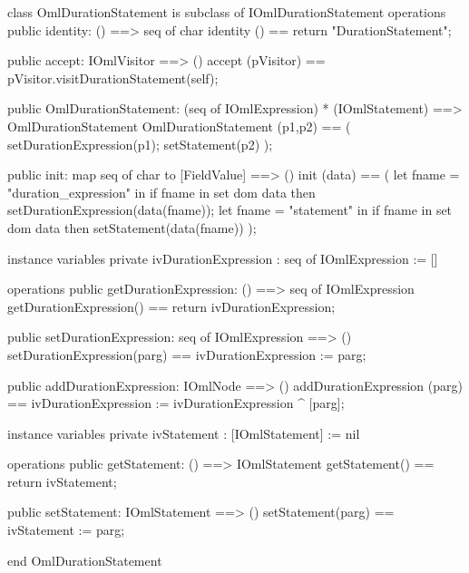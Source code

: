 \begin{vdm_al}
class OmlDurationStatement is subclass of IOmlDurationStatement
operations
  public identity: () ==> seq of char
  identity () == return "DurationStatement";

  public accept: IOmlVisitor ==> ()
  accept (pVisitor) == pVisitor.visitDurationStatement(self);

  public OmlDurationStatement:
      (seq of IOmlExpression) *
      (IOmlStatement) ==> OmlDurationStatement
  OmlDurationStatement (p1,p2) == 
   ( setDurationExpression(p1);
     setStatement(p2) );

  public init: map seq of char to [FieldValue] ==> ()
  init (data) ==
    ( let fname = "duration_expression" in
        if fname in set dom data
        then setDurationExpression(data(fname));
      let fname = "statement" in
        if fname in set dom data
        then setStatement(data(fname)) );

instance variables
  private ivDurationExpression : seq of IOmlExpression := []

operations
  public getDurationExpression: () ==> seq of IOmlExpression
  getDurationExpression() == return ivDurationExpression;

  public setDurationExpression: seq of IOmlExpression ==> ()
  setDurationExpression(parg) == ivDurationExpression := parg;

  public addDurationExpression: IOmlNode ==> ()
  addDurationExpression (parg) == ivDurationExpression := ivDurationExpression ^ [parg];

instance variables
  private ivStatement : [IOmlStatement] := nil

operations
  public getStatement: () ==> IOmlStatement
  getStatement() == return ivStatement;

  public setStatement: IOmlStatement ==> ()
  setStatement(parg) == ivStatement := parg;

end OmlDurationStatement
\end{vdm_al}

